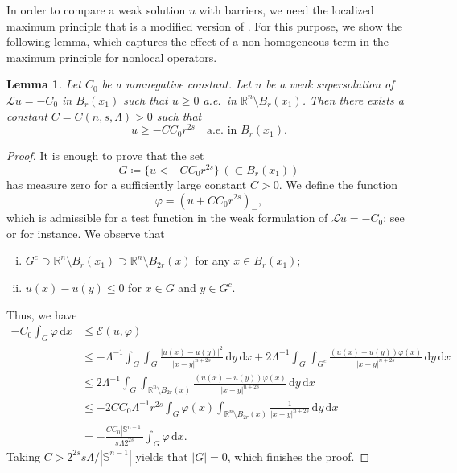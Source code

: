 \documentclass[11pt]{amsart}
\theoremstyle{plain}
\newtheorem{lemma}[theorem]{Lemma}
\theoremstyle{definition}
\numberwithin{equation}{section}
\begin{document}
In order to compare a weak solution $u$ with barriers, we need the localized maximum principle that is a modified version of \cite[Theorem~1.7]{KL25}. For this purpose, we show the following lemma, which captures the effect of a non-homogeneous term in the maximum principle for nonlocal operators. 

\begin{lemma}\label{lem-MP-nonhom}
Let $C_0$ be a nonnegative constant. Let $u$ be a weak supersolution of $\mathcal{L}u = -C_0$ in $B_{r}(x_1)$ such that $u \geq 0$ a.e.\ in $\mathbb{R}^n \setminus B_r(x_1)$. Then there exists a constant $C=C(n, s, \Lambda)>0$ such that
\begin{equation*}
    u \geq -CC_0r^{2s} \quad \text{a.e.\ in $B_r(x_1)$}.
\end{equation*}
\end{lemma}

\begin{proof}
It is enough to prove that the set
\begin{equation*}
G\coloneqq\{u<-CC_0r^{2s}\} \, (\subset B_r(x_1))
\end{equation*}
has measure zero for a sufficiently large constant $C>0$. We define the function
\begin{equation*}
\varphi=(u+CC_0r^{2s})_-,
\end{equation*}
which is admissible for a test function in the weak formulation of $\mathcal{L}u=-C_0$; see  or \cite[Proposition~2.6]{KL25} for instance. We observe that 
\begin{enumerate}[(i)]
    \item $G^c \supset \mathbb{R}^n \setminus B_r(x_1) \supset \mathbb{R}^n \setminus B_{2r}(x)$ for any $x \in B_r(x_1)$;

    \item $u(x)-u(y) \leq 0$ for $x \in G$ and $y \in G^c$.
\end{enumerate}
Thus, we have
\begin{align*}
-C_0 \int_G \varphi \,\mathrm{d}x
&\leq \mathcal{E}(u, \varphi) \\
&\leq - \Lambda^{-1}\int_G \int_G \frac{|u(x)-u(y)|^2}{|x-y|^{n+2s}} \,\mathrm{d}y \,\mathrm{d}x + 2\Lambda^{-1}\int_G \int_{G^c} \frac{(u(x)-u(y))\varphi(x)}{|x-y|^{n+2s}} \,\mathrm{d}y \,\mathrm{d}x \\
&\leq 2\Lambda^{-1}\int_G \int_{\mathbb{R}^n \setminus B_{2r}(x)} \frac{(u(x)-u(y))\varphi(x)}{|x-y|^{n+2s}} \,\mathrm{d}y \,\mathrm{d}x \\
&\leq -2CC_0 \Lambda^{-1} r^{2s}\int_G \varphi(x) \int_{\mathbb{R}^n \setminus B_{2r}(x)} \frac{1}{|x-y|^{n+2s}} \,\mathrm{d}y \,\mathrm{d}x \\
&= - \frac{CC_0 |\mathbb{S}^{n-1}|}{s \Lambda 2^{2s}} \int_G \varphi \,\mathrm{d}x.
\end{align*}
Taking $C>2^{2s}s\Lambda /|\mathbb{S}^{n-1}|$ yields that $|G|=0$, which finishes the proof.
\end{proof}
\end{document}
